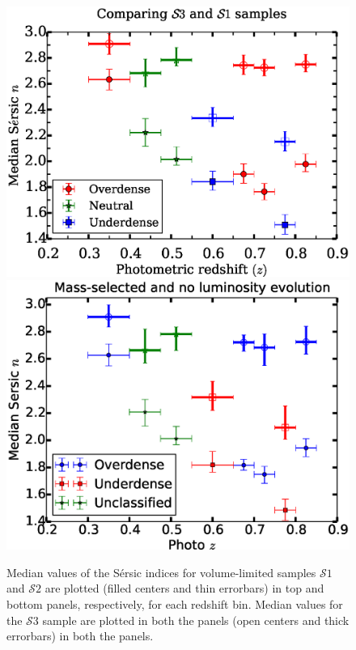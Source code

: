 \documentclass[twocolumn,useAMS,usenatbib]{mn2e}
\newcommand{\sersic}{S\'{e}rsic }
\newcommand{\s}{\ensuremath{\mathcal{S}}}
\begin{document}
\begin{figure}
 \includegraphics[width=1.0\columnwidth]{median_sersicn}
 \includegraphics[width=1.0\columnwidth]{median_sersicn2}
 \caption{Median values of the \sersic indices for volume-limited
   samples \s$1$ and \s$2$ are plotted (filled centers and thin
   errorbars) in top and bottom panels, respectively, for each
   redshift bin. 
          Median values for the \s$3$ sample are plotted in both the
          panels (open centers and thick errorbars) in both the
          panels.
     }
 \label{fig:median_sersicn}
\end{figure}
\end{document}
